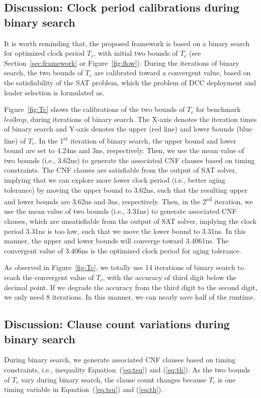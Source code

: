 \subsection{Discussion: Clock period calibrations during binary search}

It is worth reminding that, the proposed framework is based on a binary search for optimized clock period $T_{c}$, with initial two bounds of $T_{c}$ (see Section~\ref{sec:framework} or Figure~\ref{fig:flow}). During the iterations of binary search, the two bounds of $T_{c}$ are calibrated toward a convergent value, based on the satisfiability of the SAT problem, which the problem of DCC deployment and leader selection is formulated as.

Figure~\ref{fig:Tc} shows the calibrations of the two bounds of $T_{c}$ for benchmark $leo3mp$, during iterations of binary search. The X-axis denotes the iteration times of binary search and Y-axis denotes the upper (red line) and lower bounds (blue line) of $T_{c}$. In the 1\textsuperscript{st} iteration of binary search, the upper bound and lower bound are set to 4.24ns and 3ns, respectively. Then, we use the mean value of two bounds (i.e., 3.62ns) to generate the associated CNF clauses based on timing constraints. The CNF clauses are satisfiable from the output of SAT solver, implying that we can explore more lower clock period (i.e., better aging tolerance) by moving the upper bound to 3.62ns, such that the resulting upper and lower bounds are 3.62ns and 3ns, respectively. Then, in the 2\textsuperscript{ed} iteration, we use the mean value of two bounds (i.e., 3.31ns) to generate associated CNF clauses, which are unsatisfiable from the output of SAT solver, implying the clock period 3.31ns is too low, such that we move the lower bound to 3.31ns. In this manner, the upper and lower bounds will converge toward 3.4061ns. The convergent value of 3.406ns is the optimized clock period for aging tolerance.

As observed in Figure~\ref{fig:Tc}, we totally use 14 iterations of binary search to reach the convergent value of $T_{c}$, with the accuracy of third digit below the decimal point. If we degrade the accuracy from the third digit to the second digit, we only need 8 iterations. In this manner, we can nearly save half of the runtime. 
\subsection{Discussion: Clause count variations during binary search}

During binary search, we generate associated CNF clauses based on timing constraints, i.e., inequality Equation~(\ref{eq:tsu}) and (\ref{eq:th}). 
As the two bounds of $T_{c}$ vary during binary search, the clause count changes because $T_{c}$ is one timing variable in Equation~(\ref{eq:tsu}) and (\ref{eq:th}). 

